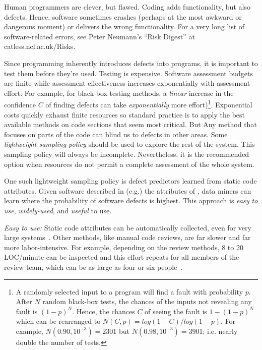 
Human programmers are clever, but flawed. Coding  adds functionality, but also defects.
Hence, software sometimes crashes (perhaps at the most awkward or dangerous moment) or delivers
the wrong functionality. For a very long list of software-related errors,
see  Peter Neumann's ``Risk Digest'' at catless.ncl.ac.uk/Risks.

Since programming inherently
introduces defects into  programs, it is important to test them before they're used.
Testing is expensive.
Software assessment budgets are finite
while assessment effectiveness increases 
exponentially with assessment effort.
For example, for  black-box testing methods,
a {\em linear} increase
in the confidence $C$ of finding  defects
can take {\em exponentially} more effort)\footnote{A randomly selected 
input to a program will find a fault with probability $p$.
After $N$ random black-box tests, the chances of the inputs 
not revealing any fault 
is $(1-p)^N$. Hence, the chances $C$ of seeing the fault is $1-(1-p)^N$
which can be rearranged to 
 $N(C,p)=log(1 -
C)/log(1-p)$. For example, $N(0.90,10^{-3})=2301$
but $N(0.98,10^{-3})=3901$; i.e. nearly double the number of tests.}.
Exponential costs quickly exhaust finite resources so
standard practice is to apply the best
available  methods on code sections that seem   most critical. 
But 
Any method that focuses on parts of the code
can blind us to defects in other areas. Some  {\em
lightweight sampling policy} should be used to explore the rest of the system.  This
sampling policy will always be incomplete.
Nevertheless, it is the recommended option when
resources do not permit a complete assessment of the whole system.

One such lightweight sampling policy is defect predictors learned from static code attributes.
Given software described in (e.g.) the attributes of ,   data miners can
learn where the probability of software defects is highest.
This approach is   {\em easy to
use}, {\em widely-used}, and {\em useful} to use.

{\em Easy to use:} Static code attributes can be automatically collected, even for very large systems~\cite{nagappan05}.
Other methods, like  manual code reviews, are far slower and far more labor-intensive.
For example, depending on the review methods, 8 to 20 LOC/minute can be
inspected and this effort repeats for all members of the review team,
which can be as large as four or six people~\cite{me02f}. 

